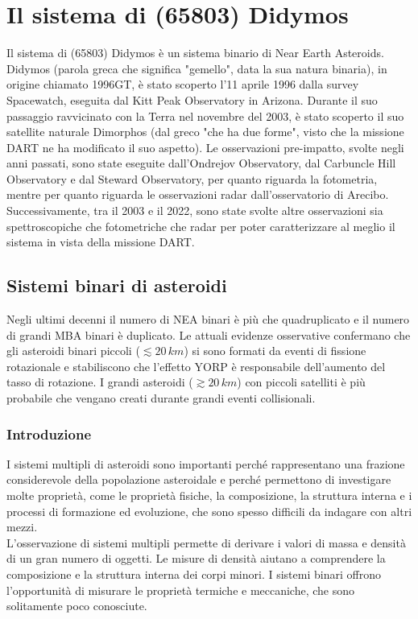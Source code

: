 \documentclass[a4paper,11pt,openright]{book}
\begin{document}
\chapter{Il sistema di (65803) Didymos}\label{ch:ch_4}
Il sistema di (65803) Didymos è un sistema binario di Near Earth Asteroids.\\
Didymos (parola greca che significa "gemello", data la sua natura binaria), in origine chiamato 1996GT, è stato scoperto l'11 aprile 1996 dalla survey Spacewatch, eseguita dal Kitt Peak Observatory in Arizona. Durante il suo passaggio ravvicinato con la Terra nel novembre del 2003, è stato scoperto il suo satellite naturale Dimorphos (dal greco "che ha due forme", visto che la missione DART ne ha modificato il suo aspetto). Le osservazioni pre-impatto, svolte negli anni passati, sono state eseguite dall'Ondrejov Observatory, dal Carbuncle Hill Observatory e dal Steward Observatory, per quanto riguarda la fotometria, mentre per quanto riguarda le osservazioni radar dall'osservatorio di Arecibo.\\
Successivamente, tra il 2003 e il 2022, sono state svolte altre osservazioni sia spettroscopiche che fotometriche che radar per poter caratterizzare al meglio il sistema in vista della missione DART.

\section{Sistemi binari di asteroidi}\label{sec:binary_system}
Negli ultimi decenni il numero di NEA binari è più che quadruplicato e il numero di grandi MBA binari è duplicato. Le attuali evidenze osservative confermano che gli asteroidi binari piccoli ($\lesssim 20\,km$) si sono formati da eventi di fissione rotazionale e stabiliscono che l'effetto YORP è responsabile dell'aumento del tasso di rotazione. I grandi asteroidi ($\gtrsim20\,km$) con piccoli satelliti è più probabile che vengano creati durante grandi eventi collisionali.

\subsection{Introduzione}
I sistemi multipli di asteroidi sono importanti perché rappresentano una frazione considerevole della popolazione asteroidale e perché permettono di investigare molte proprietà, come le proprietà fisiche, la composizione, la struttura interna e i processi di formazione ed evoluzione, che sono spesso difficili da indagare con altri mezzi.\\
L'osservazione di sistemi multipli permette di derivare i valori di massa e densità di un gran numero di oggetti. Le misure di densità aiutano a comprendere la composizione e la struttura interna dei corpi minori. I sistemi binari offrono l'opportunità di misurare le proprietà termiche e meccaniche, che sono solitamente poco conosciute.
\end{document}
